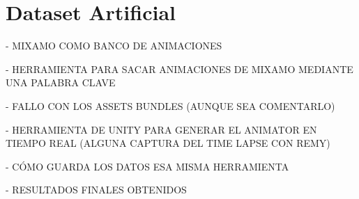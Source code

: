 \section{Dataset Artificial}
\label{sec:datasetArtificial}
- MIXAMO COMO BANCO DE ANIMACIONES

- HERRAMIENTA PARA SACAR ANIMACIONES DE MIXAMO MEDIANTE UNA PALABRA CLAVE

- FALLO CON LOS ASSETS BUNDLES (AUNQUE SEA COMENTARLO)

- HERRAMIENTA DE UNITY PARA GENERAR EL ANIMATOR EN TIEMPO REAL (ALGUNA CAPTURA DEL TIME LAPSE CON REMY)

- CÓMO GUARDA LOS DATOS ESA MISMA HERRAMIENTA 

- RESULTADOS FINALES OBTENIDOS